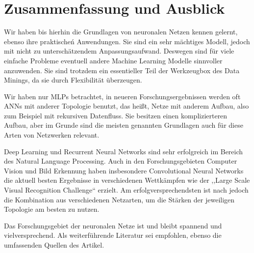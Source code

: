 \section{Zusammenfassung und Ausblick}
Wir haben bis hierhin die Grundlagen von neuronalen Netzen kennen gelernt, ebenso ihre praktischeń Anwendungen. 
Sie sind ein sehr mächtiges Modell, jedoch mit nicht zu unterschätzendem Anpassungsaufwand. Deswegen sind für viele einfache Probleme eventuell andere Machine Learning Modelle sinnvoller anzuwenden. Sie sind trotzdem ein essentieller Teil der Werkzeugbox des Data Minings, da sie durch Flexibilität überzeugen. 

Wir haben nur MLPs betrachtet, in neueren Forschungsergebnissen werden oft ANNs mit anderer Topologie benutzt, das heißt, Netze mit anderem Aufbau, also zum Beispiel mit rekursiven Datenfluss. Sie besitzen einen komplizierteren Aufbau, aber im Grunde sind die meisten genannten Grundlagen auch für diese Arten von Netzwerken relevant. 

Deep Learning und Recurrent Neural Networks sind sehr erfolgreich im Bereich des Natural Language Processing. Auch in den Forschungsgebieten Computer Vision und Bild Erkennung haben insbesondere Convolutional Neural Networks die aktuell besten Ergebnisse in verschiedenen Wettkämpfen wie der  ,,Large Scale Visual Recognition Challenge`` erzielt. Am erfolgversprechendsten ist nach \cite{LeCun2015} jedoch die Kombination aus verschiedenen Netzarten, um die Stärken der jeweiligen Topologie am besten zu nutzen. 

Das Forschungsgebiet der neuronalen Netze ist und bleibt spannend und vielversprechend. Als weiterführende Literatur sei \cite{LeCun2015} empfohlen, ebenso die umfassenden Quellen des Artikel.


